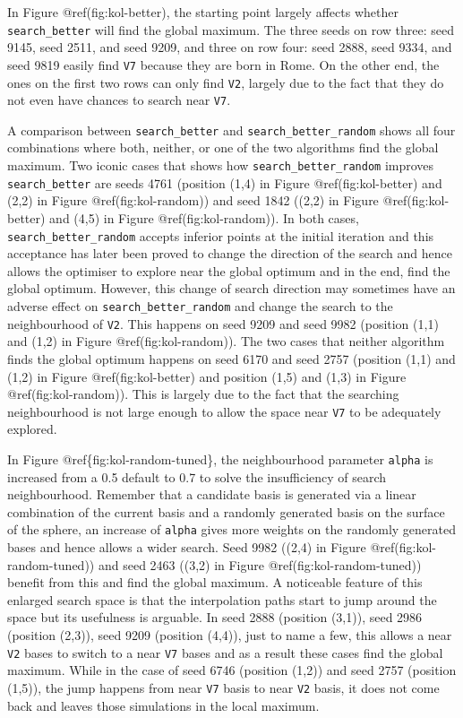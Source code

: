 In Figure @ref(fig:kol-better), the starting point largely affects whether \texttt{search\_better} will find the global maximum. The three seeds on row three: seed 9145, seed 2511, and seed 9209, and three on row four: seed 2888, seed 9334, and seed 9819 easily find \texttt{V7} because they are born in Rome. On the other end, the ones on the first two rows can only find \texttt{V2}, largely due to the fact that they do not even have chances to search near \texttt{V7}.

A comparison between \texttt{search\_better} and \texttt{search\_better\_random} shows all four combinations where both, neither, or one of the two algorithms find the global maximum. Two iconic cases that shows how \texttt{search\_better\_random} improves \texttt{search\_better} are seeds 4761 (position (1,4) in Figure @ref(fig:kol-better) and (2,2) in Figure @ref(fig:kol-random)) and seed 1842 ((2,2) in Figure @ref(fig:kol-better) and (4,5) in Figure @ref(fig:kol-random)). In both cases, \texttt{search\_better\_random} accepts inferior points at the initial iteration and this acceptance has later been proved to change the direction of the search and hence allows the optimiser to explore near the global optimum and in the end, find the global optimum. However, this change of search direction may sometimes have an adverse effect on \texttt{search\_better\_random} and change the search to the neighbourhood of \texttt{V2}. This happens on seed 9209 and seed 9982 (position (1,1) and (1,2) in Figure @ref(fig:kol-random)). The two cases that neither algorithm finds the global optimum happens on seed 6170 and seed 2757 (position (1,1) and (1,2) in Figure @ref(fig:kol-better) and position (1,5) and (1,3) in Figure @ref(fig:kol-random)). This is largely due to the fact that the searching neighbourhood is not large enough to allow the space near \texttt{V7} to be adequately explored.

In Figure @ref\{fig:kol-random-tuned\}, the neighbourhood parameter \texttt{alpha} is increased from a 0.5 default to 0.7 to solve the insufficiency of search neighbourhood. Remember that a candidate basis is generated via a linear combination of the current basis and a randomly generated basis on the surface of the sphere, an increase of \texttt{alpha} gives more weights on the randomly generated bases and hence allows a wider search. Seed 9982 ((2,4) in Figure @ref(fig:kol-random-tuned)) and seed 2463 ((3,2) in Figure @ref(fig:kol-random-tuned)) benefit from this and find the global maximum. A noticeable feature of this enlarged search space is that the interpolation paths start to jump around the space but its usefulness is arguable. In seed 2888 (position (3,1)), seed 2986 (position (2,3)), seed 9209 (position (4,4)), just to name a few, this allows a near \texttt{V2} bases to switch to a near \texttt{V7} bases and as a result these cases find the global maximum. While in the case of seed 6746 (position (1,2)) and seed 2757 (position (1,5)), the jump happens from near \texttt{V7} basis to near \texttt{V2} basis, it does not come back and leaves those simulations in the local maximum.

